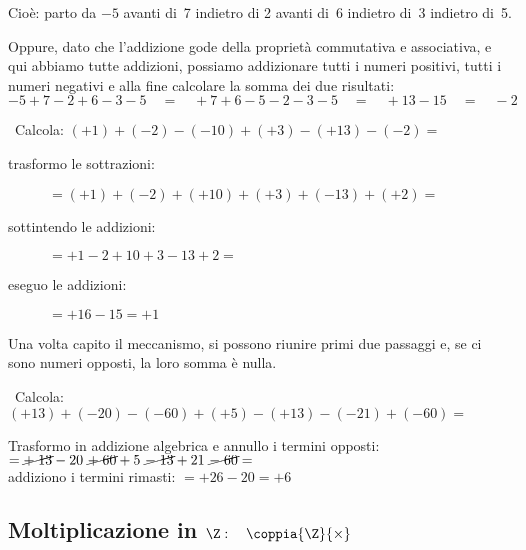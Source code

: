 {\sommalgebrica}

Cioè: parto da \(-5\) avanti di~7 indietro di 2 avanti di~6 indietro 
di~3 indietro di~5.

Oppure, dato che l'addizione gode della proprietà commutativa e associativa, 
e qui abbiamo tutte addizioni,
possiamo addizionare tutti i numeri positivi, tutti i numeri negativi e alla 
fine calcolare la somma dei due risultati:
\[-5+7-2+6-3-5 \quad=\quad +7+6-5-2-3-5 \quad=\quad +13 -15 \quad=\quad -2\]

\begin{esempio}{}{}
~Calcola: \((+1)+(-2)-(-10)+(+3)-(+13)-(-2)=\) 
\begin{description}
\item [trasformo le sottrazioni: \quad ] 
\(=(+1)+(-2)+(+10)+(+3)+(-13)+(+2)=\)
\item [sottintendo le addizioni: \quad ] \(=+1-2+10+3-13+2=\)
\item [eseguo le addizioni: \qquad ~~\, ] \(=+16-15=+1\)
\end{description}
\end{esempio}

Una volta capito il meccanismo, si possono riunire primi due passaggi 
e, se ci sono numeri opposti, la loro somma è nulla.

\begin{esempio}{}{}
~Calcola: \\
\((+13)+(-20)-(-60)+(+5)-(+13)-(-21)+(-60)=\) 

Trasformo in addizione algebrica e annullo i termini opposti:\\
\(=\cancel{+\;13}-20~\cancel{+\;60}+5~\cancel{-\;13}+21~\cancel{-\;60}=\)\\
addiziono i termini rimasti:\hspace{15.3mm}
\(= +26 - 20 = +6\)
\end{esempio}


\subsection{Moltiplicazione in 
\texorpdfstring{$\Z: \quad \coppia{\Z}{\times}$}{Z: (Z; x)}}

